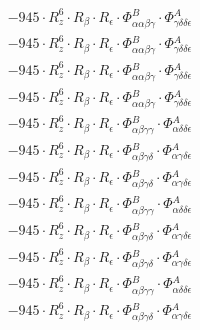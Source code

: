 \documentclass{article}
\begin{document}
\begin{subequations}
\begin{gather}
\begin{array}{c}
 \\[0.2em] 		 - 945 \cdot R_{z}^{6} \cdot R_{\beta{}} \cdot R_{\epsilon{}} \cdot \Phi{}^{B}_{\alpha{}\alpha{}\beta{}\gamma{}} \cdot \Phi{}^{A}_{\gamma{}\delta{}\delta{}\epsilon{}} 
 \\[0.2em] 		 - 945 \cdot R_{z}^{6} \cdot R_{\beta{}} \cdot R_{\epsilon{}} \cdot \Phi{}^{B}_{\alpha{}\alpha{}\beta{}\gamma{}} \cdot \Phi{}^{A}_{\gamma{}\delta{}\delta{}\epsilon{}} 
 \\[0.2em] 		 - 945 \cdot R_{z}^{6} \cdot R_{\beta{}} \cdot R_{\epsilon{}} \cdot \Phi{}^{B}_{\alpha{}\alpha{}\beta{}\gamma{}} \cdot \Phi{}^{A}_{\gamma{}\delta{}\delta{}\epsilon{}} 
 \\[0.2em] 		 - 945 \cdot R_{z}^{6} \cdot R_{\beta{}} \cdot R_{\epsilon{}} \cdot \Phi{}^{B}_{\alpha{}\alpha{}\beta{}\gamma{}} \cdot \Phi{}^{A}_{\gamma{}\delta{}\delta{}\epsilon{}} 
 \\[0.2em] 		 - 945 \cdot R_{z}^{6} \cdot R_{\beta{}} \cdot R_{\epsilon{}} \cdot \Phi{}^{B}_{\alpha{}\beta{}\gamma{}\gamma{}} \cdot \Phi{}^{A}_{\alpha{}\delta{}\delta{}\epsilon{}} 
 \\[0.2em] 		 - 945 \cdot R_{z}^{6} \cdot R_{\beta{}} \cdot R_{\epsilon{}} \cdot \Phi{}^{B}_{\alpha{}\beta{}\gamma{}\delta{}} \cdot \Phi{}^{A}_{\alpha{}\gamma{}\delta{}\epsilon{}} 
 \\[0.2em] 		 - 945 \cdot R_{z}^{6} \cdot R_{\beta{}} \cdot R_{\epsilon{}} \cdot \Phi{}^{B}_{\alpha{}\beta{}\gamma{}\delta{}} \cdot \Phi{}^{A}_{\alpha{}\gamma{}\delta{}\epsilon{}} 
 \\[0.2em] 		 - 945 \cdot R_{z}^{6} \cdot R_{\beta{}} \cdot R_{\epsilon{}} \cdot \Phi{}^{B}_{\alpha{}\beta{}\gamma{}\gamma{}} \cdot \Phi{}^{A}_{\alpha{}\delta{}\delta{}\epsilon{}} 
 \\[0.2em] 		 - 945 \cdot R_{z}^{6} \cdot R_{\beta{}} \cdot R_{\epsilon{}} \cdot \Phi{}^{B}_{\alpha{}\beta{}\gamma{}\delta{}} \cdot \Phi{}^{A}_{\alpha{}\gamma{}\delta{}\epsilon{}} 
 \\[0.2em] 		 - 945 \cdot R_{z}^{6} \cdot R_{\beta{}} \cdot R_{\epsilon{}} \cdot \Phi{}^{B}_{\alpha{}\beta{}\gamma{}\delta{}} \cdot \Phi{}^{A}_{\alpha{}\gamma{}\delta{}\epsilon{}} 
 \\[0.2em] 		 - 945 \cdot R_{z}^{6} \cdot R_{\beta{}} \cdot R_{\epsilon{}} \cdot \Phi{}^{B}_{\alpha{}\beta{}\gamma{}\gamma{}} \cdot \Phi{}^{A}_{\alpha{}\delta{}\delta{}\epsilon{}} 
 \\[0.2em] 		 - 945 \cdot R_{z}^{6} \cdot R_{\beta{}} \cdot R_{\epsilon{}} \cdot \Phi{}^{B}_{\alpha{}\beta{}\gamma{}\delta{}} \cdot \Phi{}^{A}_{\alpha{}\gamma{}\delta{}\epsilon{}} 

\end{array}
\end{gather}
\end{subequations}
\end{document}
